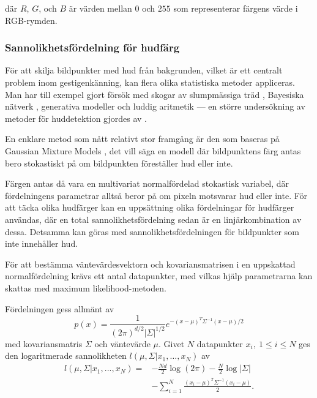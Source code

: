 \documentclass[../rapport_MVEX01-11-05]{subfiles}
\begin{document}
där $R$, $G$, och $B$ är värden mellan $0$ och $255$ som representerar
färgens värde i RGB-rymden.

\subsubsection{Sannolikhetsfördelning för hudfärg}

För att skilja bildpunkter med hud från bakgrunden, vilket är ett
centralt problem inom gestigenkänning, kan flera olika statistiska
metoder
appliceras. Man har till exempel gjort försök med skogar av
slumpmässiga träd
\cite{Khan10}, Bayesiska nätverk \cite{Sebe04}, generativa modeller
\cite{Kruppa02}
och luddig aritmetik \cite{Shang10} --- en större undersökning av metoder
för huddetektion gjordes av .

En enklare metod som nått relativt stor framgång är den som baseras på
Gaussian Mixture Models \cite{Elmezain08,Hassanpour08}, det vill säga
en modell där bildpunktens färg antas bero stokastiskt på om
bildpunkten föreställer hud eller inte.

Färgen antas då vara en multivariat normalfördelad
stokastisk variabel, där fördelningens parametrar alltså beror på om
pixeln motsvarar hud eller inte. För att täcka olika hudfärger kan en
uppsättning olika
fördelningar för hudfärger användas, där en total
sannolikhetsfördelning sedan är en linjärkombination av dessa. Detsamma
kan göras med sannolikhetsfördelningen för bildpunkter som inte
innehåller hud.

För att bestämma väntevärdesvektorn och kovariansmatrisen i en
uppskattad normalfördelning krävs ett
antal datapunkter, med vilkas hjälp parametrarna kan skattas med maximum
likelihood-metoden.

Fördelningen gess allmänt av
\begin{equation*}
  p(x)=\frac{1}{(2\pi)^{d/2}|\Sigma|^{1/2}}e^{-(x-\mu)^T\Sigma^{-1}(x-\mu)/2}
\end{equation*}
med kovariansmatris $\Sigma$ och väntevärde $\mu$.
Givet $N$ datapunkter $x_i,\:1\leq i\leq N$ ges den logaritmerade
sannolikheten $l(\mu,\Sigma|x_1,{\ldots} ,x_N)$ av
\begin{equation*}
  \begin{aligned}
  l(\mu,\Sigma|x_1,...,x_N) = &-\frac{Nd}{2}\log(2\pi)-\frac{N}{2}\log|\Sigma|\\
                              &-\sum_{i=1}^N\frac{(x_i-\mu)^T\Sigma^{-1}(x_i-\mu)}{2}.
  \end{aligned}
\end{equation*}
\end{document}
